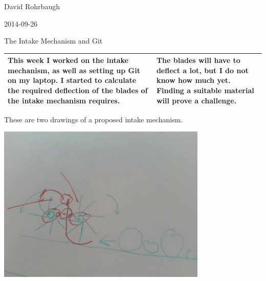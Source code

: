David Rohrbaugh

2014-09-26

The Intake Mechanism and Git

\begin{tabular}{|p{5cm}|p{5cm}|}
 \hline
 This week I worked on the intake mechanism, as well as setting up Git on my laptop. I started to calculate the required deflection of the blades of the intake mechanism requires.
 &
 The blades will have to deflect a lot, but I do not know how much yet. Finding a suitable material will prove a challenge.
 \\
 \hline
\end{tabular}

\medskip

These are two drawings of a proposed intake mechanism.

\begin{center}
 \includegraphics[width=10cm]{./Entries/Images/intake_device.png}
\end{center}
